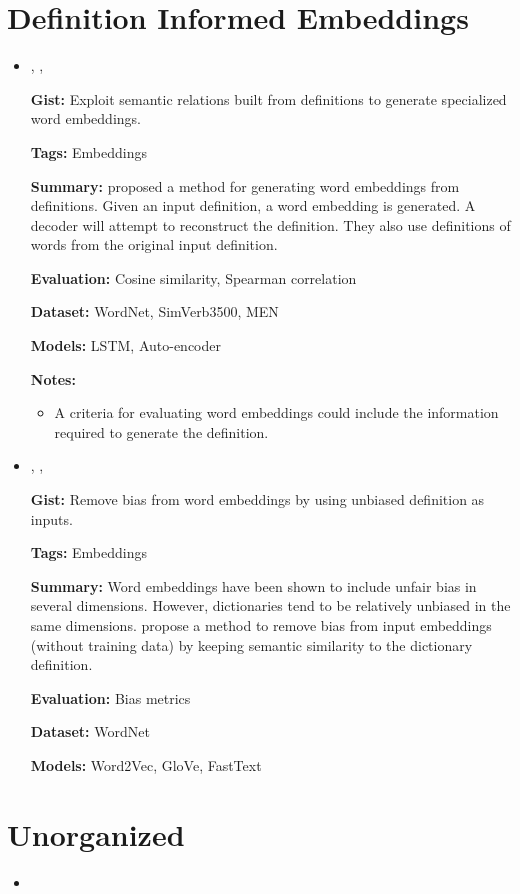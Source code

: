 \documentclass{article}[a4paper]
\newcommand{\bitem}[2]{
    \item[\cite{#1}]
        \citetitle{#1}, \citeauthor{#1}, \citeyear{#1}
        \newline
        {#2}
}%
\begin{document}
\section{Definition Informed Embeddings}
\begin{itemize}
    \bitem{bosc_auto_2018}%
    {%
        \textbf{Gist:}
        Exploit semantic relations built from definitions to generate specialized
        word embeddings.

        \textbf{Tags:}
        Embeddings

        \textbf{Summary:}
        \citeauthor{bosc_auto_2018} proposed a method for generating word
        embeddings from definitions. Given an input definition, a word embedding
        is generated. A decoder will attempt to reconstruct the definition. They
        also use definitions of words from the original input definition.

        \textbf{Evaluation:}
        Cosine similarity, Spearman correlation

        \textbf{Dataset:}
        WordNet, SimVerb3500, MEN

        \textbf{Models:}
        LSTM, Auto-encoder

        \textbf{Notes:}
        \begin{itemize}
            \item A criteria for evaluating word embeddings could include the
                  information required to generate the definition.
        \end{itemize}
    }%

    \bitem{kaneko_dictionary_2021}%
    {%
        \textbf{Gist:}
        Remove bias from word embeddings by using unbiased definition as inputs.

        \textbf{Tags:}
        Embeddings

        \textbf{Summary:}
        Word embeddings have been shown to include unfair bias in several
        dimensions. However, dictionaries tend to be relatively unbiased in the
        same dimensions. \citeauthor{kaneko_dictionary_2021} propose a method
        to remove bias from input embeddings (without training data) by keeping
        semantic similarity to the dictionary definition.

        \textbf{Evaluation:}
        Bias metrics

        \textbf{Dataset:}
        WordNet

        \textbf{Models:}
        Word2Vec, GloVe, FastText
    }%
\end{itemize}

\section{Unorganized}
\begin{itemize}
    \item
\end{itemize}

\printbibliography
\end{document}
